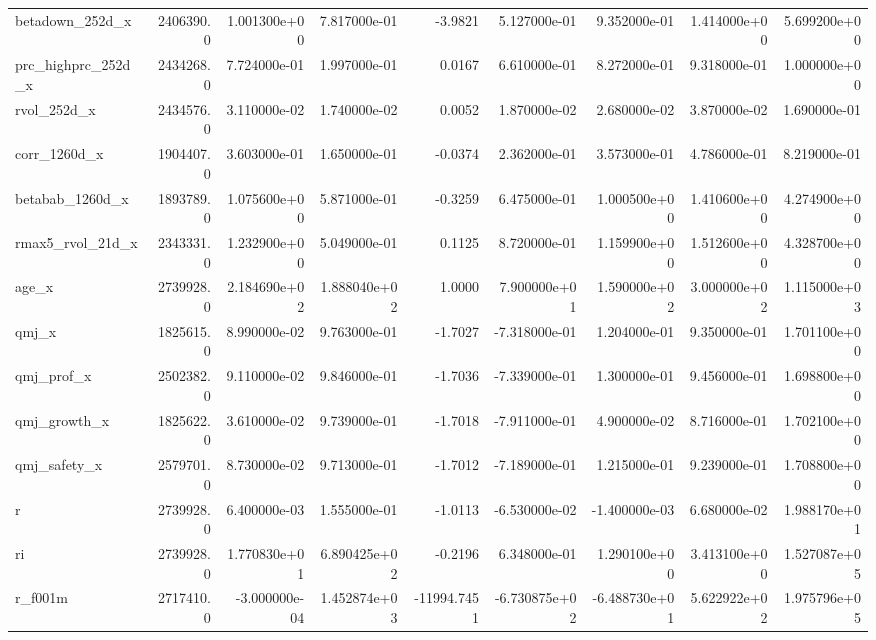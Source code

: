 \documentclass[12pt]{article}
\begin{document}
\begin{landscape}
\begin{longtable}{|l|r|r|r|r|r|r|r|r|}
betadown\_252d\_x         &  2406390.0 &  1.001300e+00 &  7.817000e-01 &     -3.9821 &  5.127000e-01 &  9.352000e-01 &  1.414000e+00 &  5.699200e+00 \\
prc\_highprc\_252d\_x      &  2434268.0 &  7.724000e-01 &  1.997000e-01 &      0.0167 &  6.610000e-01 &  8.272000e-01 &  9.318000e-01 &  1.000000e+00 \\
rvol\_252d\_x             &  2434576.0 &  3.110000e-02 &  1.740000e-02 &      0.0052 &  1.870000e-02 &  2.680000e-02 &  3.870000e-02 &  1.690000e-01 \\
corr\_1260d\_x            &  1904407.0 &  3.603000e-01 &  1.650000e-01 &     -0.0374 &  2.362000e-01 &  3.573000e-01 &  4.786000e-01 &  8.219000e-01 \\
betabab\_1260d\_x         &  1893789.0 &  1.075600e+00 &  5.871000e-01 &     -0.3259 &  6.475000e-01 &  1.000500e+00 &  1.410600e+00 &  4.274900e+00 \\
rmax5\_rvol\_21d\_x        &  2343331.0 &  1.232900e+00 &  5.049000e-01 &      0.1125 &  8.720000e-01 &  1.159900e+00 &  1.512600e+00 &  4.328700e+00 \\
age\_x                   &  2739928.0 &  2.184690e+02 &  1.888040e+02 &      1.0000 &  7.900000e+01 &  1.590000e+02 &  3.000000e+02 &  1.115000e+03 \\
qmj\_x                   &  1825615.0 &  8.990000e-02 &  9.763000e-01 &     -1.7027 & -7.318000e-01 &  1.204000e-01 &  9.350000e-01 &  1.701100e+00 \\
qmj\_prof\_x              &  2502382.0 &  9.110000e-02 &  9.846000e-01 &     -1.7036 & -7.339000e-01 &  1.300000e-01 &  9.456000e-01 &  1.698800e+00 \\
qmj\_growth\_x            &  1825622.0 &  3.610000e-02 &  9.739000e-01 &     -1.7018 & -7.911000e-01 &  4.900000e-02 &  8.716000e-01 &  1.702100e+00 \\
qmj\_safety\_x            &  2579701.0 &  8.730000e-02 &  9.713000e-01 &     -1.7012 & -7.189000e-01 &  1.215000e-01 &  9.239000e-01 &  1.708800e+00 \\
r                       &  2739928.0 &  6.400000e-03 &  1.555000e-01 &     -1.0113 & -6.530000e-02 & -1.400000e-03 &  6.680000e-02 &  1.988170e+01 \\
ri                      &  2739928.0 &  1.770830e+01 &  6.890425e+02 &     -0.2196 &  6.348000e-01 &  1.290100e+00 &  3.413100e+00 &  1.527087e+05 \\
r\_f001m                 &  2717410.0 & -3.000000e-04 &  1.452874e+03 & -11994.7451 & -6.730875e+02 & -6.488730e+01 &  5.622922e+02 &  1.975796e+05 \\

\end{longtable}
\end{landscape}
\end{document}
